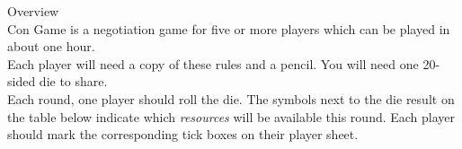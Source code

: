 \begin{minipage}{6cm}\raggedright
{\setmainfont[Scale=0.95]{Century Gothic-Bold}\LARGE Overview}\\[1.0ex]

\setmainfont{Tex Gyre Schola}
Con Game is a negotiation game for five or more players which can be played in about one hour.\\[1.25ex]

Each player will need a copy of these rules and a pencil. You will need one 20-sided die to share.\\[1.25ex]

Each round, one player should roll the die. The symbols next to the die result on the table below indicate which \emph{resources} will be available this round. Each player should mark the corresponding tick boxes on their player sheet.
\end{minipage}

